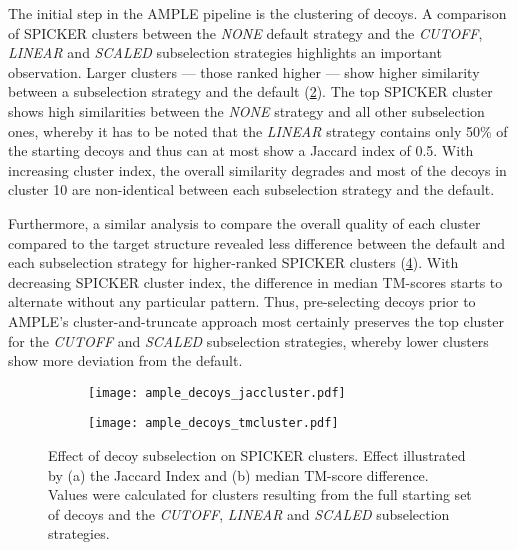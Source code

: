 The initial step in the AMPLE pipeline is the clustering of decoys. A comparison of SPICKER clusters between the \textit{NONE} default strategy and the \textit{CUTOFF}, \textit{LINEAR} and \textit{SCALED} subselection strategies highlights an important observation. Larger clusters --- those ranked higher --- show higher similarity between a subselection strategy and the default (\cref{fig:ample_decoys_jaccluster}). The top SPICKER cluster shows high similarities between the \textit{NONE} strategy and all other subselection ones, whereby it has to be noted that the \textit{LINEAR} strategy contains only 50\% of the starting decoys and thus can at most show a Jaccard index of 0.5. With increasing cluster index, the overall similarity degrades and most of the decoys in cluster 10 are non-identical between each subselection strategy and the default. 

Furthermore, a similar analysis to compare the overall quality of each cluster compared to the target structure revealed less difference between the default and each subselection strategy for higher-ranked SPICKER clusters (\cref{fig:ample_decoys_tmcluster}). With decreasing SPICKER cluster index, the difference in median TM-scores starts to alternate without any particular pattern. Thus, pre-selecting decoys prior to AMPLE's cluster-and-truncate approach most certainly preserves the top cluster for the \textit{CUTOFF} and \textit{SCALED} subselection strategies, whereby lower clusters show more deviation from the default.

\begin{figure}[H]
    \centering
    \begin{subfigure}[b]{\textwidth}
        \texttt{[image: ample\_decoys\_jaccluster.pdf]}
        \caption{}
        \label{fig:ample_decoys_jaccluster}
    \end{subfigure}
\end{figure}

\begin{figure}[H]\ContinuedFloat
    \begin{subfigure}[b]{\textwidth}
        \texttt{[image: ample\_decoys\_tmcluster.pdf]}
        \caption{}
        \label{fig:ample_decoys_tmcluster}
    \end{subfigure}
    \caption[Effect of decoy subselection on SPICKER clusters]{Effect of decoy subselection on SPICKER clusters. Effect illustrated by (a) the Jaccard Index and (b) median TM-score difference. Values were calculated for clusters resulting from the full starting set of decoys and the \textit{CUTOFF}, \textit{LINEAR} and \textit{SCALED} subselection strategies.}
\end{figure}

